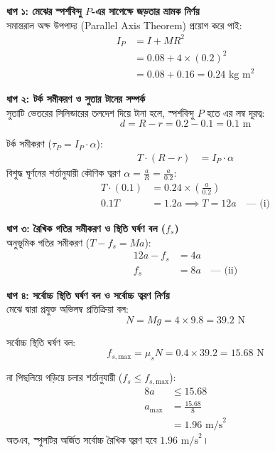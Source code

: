 \documentclass[12pt, a4paper]{article}
\begin{document}
\begin{tcolorbox}[solutionbox={সমাধান (Solution)}]
\noindent
\textbf{ধাপ ১: মেঝের স্পর্শবিন্দু $P$-এর সাপেক্ষে জড়তার ভ্রামক নির্ণয়} \\
সমান্তরাল অক্ষ উপপাদ্য (Parallel Axis Theorem) প্রয়োগ করে পাই:
\begin{align*}
    I_P &= I + M R^2 \\
        &= 0.08 + 4 \times (0.2)^2 \\
        &= 0.08 + 0.16 = 0.24\text{ kg m}^2
\end{align*}

\vspace{0.5em}
\textbf{ধাপ ২: টর্ক সমীকরণ ও সুতার টানের সম্পর্ক} \\
সুতাটি ভেতরের সিলিন্ডারের তলদেশ দিয়ে টানা হলে, স্পর্শবিন্দু $P$ হতে এর লম্ব দূরত্ব:
\[d = R - r = 0.2 - 0.1 = 0.1\text{ m}\]

টর্ক সমীকরণ ($\tau_P = I_P \cdot \alpha$):
\begin{align*}
    T \cdot (R - r) &= I_P \cdot \alpha
\end{align*}
বিশুদ্ধ ঘূর্ণনের শর্তানুযায়ী কৌণিক ত্বরণ $\alpha = \frac{a}{R} = \frac{a}{0.2}$:
\begin{align*}
    T \cdot (0.1) &= 0.24 \times \left(\frac{a}{0.2}\right) \\
    0.1 T &= 1.2 a \implies T = 12 a \quad \text{--- (i)}
\end{align*}

\vspace{0.5em}
\textbf{ধাপ ৩: রৈখিক গতির সমীকরণ ও স্থিতি ঘর্ষণ বল ($f_s$)} \\
অনুভূমিক গতির সমীকরণ ($T - f_s = M a$):
\begin{align*}
    12 a - f_s &= 4 a \\
    f_s &= 8 a \quad \text{--- (ii)}
\end{align*}

\vspace{0.5em}
\textbf{ধাপ ৪: সর্বোচ্চ স্থিতি ঘর্ষণ বল ও সর্বোচ্চ ত্বরণ নির্ণয়} \\
মেঝে দ্বারা প্রযুক্ত অভিলম্ব প্রতিক্রিয়া বল:
\[N = M g = 4 \times 9.8 = 39.2\text{ N}\]

সর্বোচ্চ স্থিতি ঘর্ষণ বল:
\[f_{s,\text{max}} = \mu_s N = 0.4 \times 39.2 = 15.68\text{ N}\]

না পিছলিয়ে গড়িয়ে চলার শর্তানুযায়ী ($f_s \le f_{s,\text{max}}$):
\begin{align*}
    8 a &\le 15.68 \\
    a_{\text{max}} &= \frac{15.68}{8} \\
    &= \mathbf{1.96}\text{ m/s}^2
\end{align*}
অতএব, স্পুলটির অর্জিত সর্বোচ্চ রৈখিক ত্বরণ হবে $1.96\text{ m/s}^2$।
\end{tcolorbox}
\end{document}
